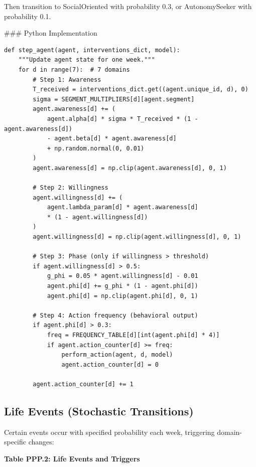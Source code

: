 Then transition to SocialOriented with probability 0.3, or AutonomySeeker with probability 0.1.

### Python Implementation

\begin{verbatim}
def step_agent(agent, interventions_dict, model):
    """Update agent state for one week."""
    for d in range(7):  # 7 domains
        # Step 1: Awareness
        T_received = interventions_dict.get((agent.unique_id, d), 0)
        sigma = SEGMENT_MULTIPLIERS[d][agent.segment]
        agent.awareness[d] += (
            agent.alpha[d] * sigma * T_received * (1 - agent.awareness[d])
            - agent.beta[d] * agent.awareness[d]
            + np.random.normal(0, 0.01)
        )
        agent.awareness[d] = np.clip(agent.awareness[d], 0, 1)

        # Step 2: Willingness
        agent.willingness[d] += (
            agent.lambda_param[d] * agent.awareness[d]
            * (1 - agent.willingness[d])
        )
        agent.willingness[d] = np.clip(agent.willingness[d], 0, 1)

        # Step 3: Phase (only if willingness > threshold)
        if agent.willingness[d] > 0.5:
            g_phi = 0.05 * agent.willingness[d] - 0.01
            agent.phi[d] += g_phi * (1 - agent.phi[d])
            agent.phi[d] = np.clip(agent.phi[d], 0, 1)

        # Step 4: Action frequency (behavioral output)
        if agent.phi[d] > 0.3:
            freq = FREQUENCY_TABLE[d][int(agent.phi[d] * 4)]
            if agent.action_counter[d] >= freq:
                perform_action(agent, d, model)
                agent.action_counter[d] = 0

        agent.action_counter[d] += 1
\end{verbatim}

\subsection{Life Events (Stochastic Transitions)}

Certain events occur with specified probability each week, triggering domain-specific changes:

\textbf{Table PPP.2: Life Events and Triggers}

